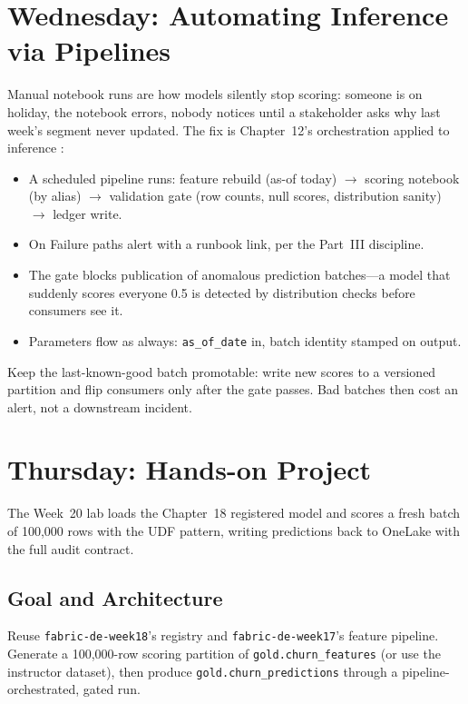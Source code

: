 \section{Wednesday: Automating Inference via Pipelines}
Manual notebook runs are how models silently stop scoring: someone is on holiday, the notebook errors, nobody notices until a stakeholder asks why last week's segment never updated. The fix is Chapter~12's orchestration applied to inference \cite{microsoftFabricPipelines,microsoftFabricMonitoringHub}:

\begin{itemize}
    \item A scheduled pipeline runs: feature rebuild (as-of today) $\rightarrow$ scoring notebook (by alias) $\rightarrow$ validation gate (row counts, null scores, distribution sanity) $\rightarrow$ ledger write.
    \item On Failure paths alert with a runbook link, per the Part~III discipline.
    \item The gate blocks publication of anomalous prediction batches---a model that suddenly scores everyone 0.5 is detected by distribution checks before consumers see it.
    \item Parameters flow as always: \texttt{as\_of\_date} in, batch identity stamped on output.
\end{itemize}

\begin{tipbox}
Keep the last-known-good batch promotable: write new scores to a versioned partition and flip consumers only after the gate passes. Bad batches then cost an alert, not a downstream incident.
\end{tipbox}

\section{Thursday: Hands-on Project}
The Week~20 lab loads the Chapter~18 registered model and scores a fresh batch of 100,000 rows with the UDF pattern, writing predictions back to OneLake with the full audit contract.

\subsection{Goal and Architecture}
Reuse \texttt{fabric-de-week18}'s registry and \texttt{fabric-de-week17}'s feature pipeline. Generate a 100,000-row scoring partition of \texttt{gold.churn\_features} (or use the instructor dataset), then produce \texttt{gold.churn\_predictions} through a pipeline-orchestrated, gated run.

